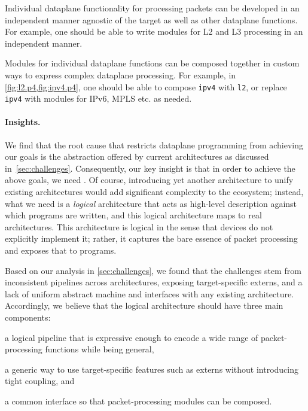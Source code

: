\documentclass[letterpaper,twocolumn,10pt]{article}
\begin{document}
 Individual dataplane functionality for processing
packets can be developed in an independent manner agnostic of the
target as well as other dataplane functions. For example, one should
be able to write modules for L2 and L3 processing in an independent
manner.

 Modules for individual dataplane functions can
be composed together in custom ways to express complex dataplane
processing. For example, in \cref{fig:l2.p4,fig:ipv4.p4}, one should
be able to compose \texttt{ipv4} with \texttt{l2}, or replace
\texttt{ipv4} with modules for IPv6, MPLS etc. as needed.





\paragraph{Insights.}
We find that the root cause that restricts dataplane programming from
achieving our goals is the abstraction offered by current
architectures as discussed in~\cref{sec:challenges}.  Consequently,
our key insight is that in order to achieve the above goals, we need
. Of course, introducing yet another architecture to unify
existing architectures would add significant complexity to the
ecosystem; instead, what we need is a \emph{logical} architecture that
acts as high-level description against which programs are written, and
this logical architecture maps to real architectures. This
architecture is logical in the sense that devices do not explicitly
implement it; rather, it captures the bare essence of packet
processing and exposes that to programs.

Based on our analysis in \cref{sec:challenges}, we found that the
challenges stem from inconsistent pipelines across architectures,
exposing target-specific externs, and a lack of uniform abstract
machine and interfaces with any existing architecture. Accordingly, we
believe that the logical architecture should have three main
components:
\begin{enumerate*}[label=(\roman*)]
  \item a logical pipeline that is expressive enough to encode a
    wide range of packet-processing functions while being general,
  \item a generic way to use target-specific features such as externs
    without introducing tight coupling, and
  \item a common interface so that packet-processing modules can be
    composed.
\end{enumerate*}
\end{document}
